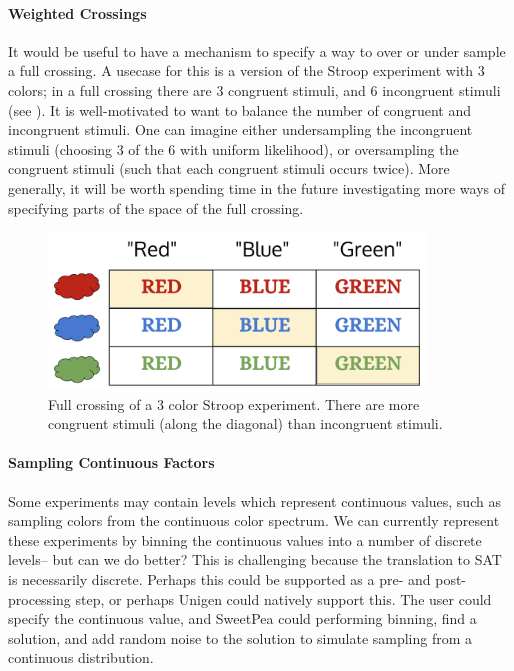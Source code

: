\paragraph*{Weighted Crossings}
It would be useful to have a mechanism to specify a way to over or under sample a full crossing. A usecase for this is a version of the Stroop experiment with 3 colors; in a full crossing there are 3 congruent stimuli, and 6 incongruent stimuli (see ). It is well-motivated to want to balance the number of congruent and incongruent stimuli. One can imagine either undersampling the incongruent stimuli (choosing 3 of the 6 with uniform likelihood), or oversampling the congruent stimuli (such that each congruent stimuli occurs twice). More generally, it will be worth spending time in the future investigating more ways of specifying parts of the space of the full crossing.

\begin{figure}[t]
    \centerline{\includegraphics[origin=c,width=10cm]{fig_weighted_crossing}}
    \caption{Full crossing of a 3 color Stroop experiment. There are more congruent stimuli (along the diagonal) than incongruent stimuli.}%
    \label{fig:weighted_crossing}%
\end{figure}

\paragraph*{Sampling Continuous Factors}
Some experiments may contain levels which represent continuous values, such as sampling colors from the continuous color spectrum. We can currently represent these experiments by binning the continuous values into a number of discrete levels-- but can we do better? This is challenging because the translation to SAT is necessarily discrete. Perhaps this could be supported as a pre- and post- processing step, or perhaps Unigen could natively support this. The user could specify the continuous value, and SweetPea could performing binning, find a solution, and add random noise to the solution to simulate sampling from a continuous distribution.

